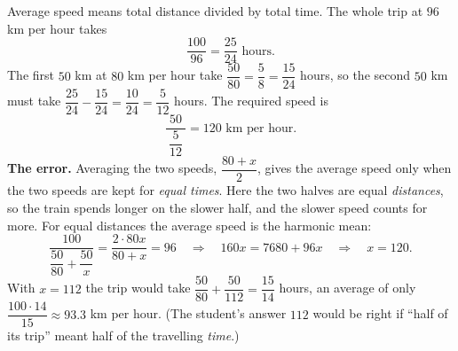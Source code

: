 Average speed means total distance divided by total time. The whole trip at $96$ km per hour takes
\[
\dfrac{100}{96}=\dfrac{25}{24}\text{ hours}.
\]
The first $50$ km at $80$ km per hour take $\dfrac{50}{80}=\dfrac{5}{8}=\dfrac{15}{24}$ hours, so the second $50$ km must take $\dfrac{25}{24}-\dfrac{15}{24}=\dfrac{10}{24}=\dfrac{5}{12}$ hours. The required speed is
\[
\dfrac{50}{\ \dfrac{5}{12}\ }=\boxed{120}\text{ km per hour}.
\]
\textbf{The error.} Averaging the two speeds, $\dfrac{80+x}{2}$, gives the average speed only when the two speeds are kept for \emph{equal times}. Here the two halves are equal \emph{distances}, so the train spends longer on the slower half, and the slower speed counts for more. For equal distances the average speed is the harmonic mean:
\[
\dfrac{100}{\dfrac{50}{80}+\dfrac{50}{x}}=\dfrac{2\cdot 80x}{80+x}=96\quad\Longrightarrow\quad 160x=7680+96x\quad\Longrightarrow\quad x=120 .
\]
With $x=112$ the trip would take $\dfrac{50}{80}+\dfrac{50}{112}=\dfrac{15}{14}$ hours, an average of only $\dfrac{100\cdot 14}{15}\approx 93.3$ km per hour. (The student's answer $112$ would be right if ``half of its trip'' meant half of the travelling \emph{time}.)
